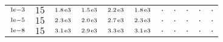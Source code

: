 \begin{tiny}
\begin{tabular}{@{$\;$}c@{$\;$}|@{$\;$}c@{$\;$}@{$\;$}c@{$\;$}@{$\;$}c@{$\;$}@{$\;$}c@{$\;$}@{$\;$}c@{$\;$}|@{$\;$}c@{$\;$}@{$\;$}c@{$\;$}@{$\;$}c@{$\;$}@{$\;$}c@{$\;$}@{$\;$}c@{$\;$}}
$\scriptstyle1\!\mathrm{\hspace{0.10em}e}-3$ & $\scriptstyle15$ & $\scriptstyle1.8\mathrm{\hspace{0.10em}e}3$ & $\scriptstyle1.5\mathrm{\hspace{0.10em}e}3$ & $\scriptstyle2.2\mathrm{\hspace{0.10em}e}3$ & $\scriptstyle1.8\mathrm{\hspace{0.10em}e}3$ & $\scriptstyle.$ & $\scriptstyle.$ & $\scriptstyle.$ & $\scriptstyle.$ & $\scriptstyle.$\\ 
$\scriptstyle1\!\mathrm{\hspace{0.10em}e}-5$ & $\scriptstyle15$ & $\scriptstyle2.3\mathrm{\hspace{0.10em}e}3$ & $\scriptstyle2.0\mathrm{\hspace{0.10em}e}3$ & $\scriptstyle2.7\mathrm{\hspace{0.10em}e}3$ & $\scriptstyle2.3\mathrm{\hspace{0.10em}e}3$ & $\scriptstyle.$ & $\scriptstyle.$ & $\scriptstyle.$ & $\scriptstyle.$ & $\scriptstyle.$\\ 
$\scriptstyle1\!\mathrm{\hspace{0.10em}e}-8$ & $\scriptstyle15$ & $\scriptstyle3.1\mathrm{\hspace{0.10em}e}3$ & $\scriptstyle2.9\mathrm{\hspace{0.10em}e}3$ & $\scriptstyle3.3\mathrm{\hspace{0.10em}e}3$ & $\scriptstyle3.1\mathrm{\hspace{0.10em}e}3$ & $\scriptstyle.$ & $\scriptstyle.$ & $\scriptstyle.$ & $\scriptstyle.$ & $\scriptstyle.$\\ 
\end{tabular} 
\end{tiny} 
